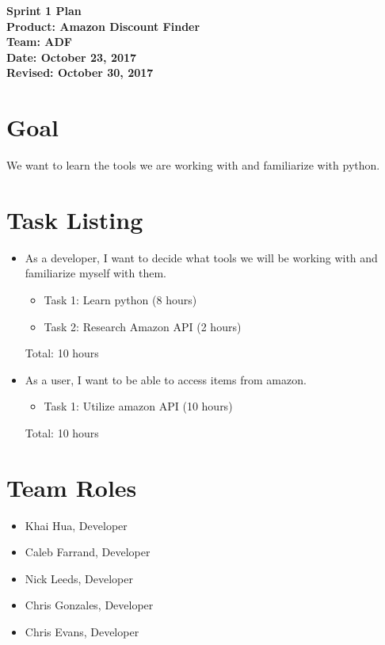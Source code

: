 \documentclass[11pt]{article}
\newcommand\tab[1][1cm]{\hspace*{#1}}
\begin{document}
	\Large{\textbf{Sprint 1 Plan}}\\
	\Large{\textbf{Product: Amazon Discount Finder}}\\
	\Large{\textbf{Team: ADF}}\\
	\Large{\textbf{Date: October 23, 2017}}\\
	\Large{\textbf{Revised: October 30, 2017}}\\
	
	\vspace{-3mm}
	
	\section{Goal}
		\vspace{-3mm}
		\tab \normalsize{We want to learn the tools we are working with and familiarize with python.}
		

	\section{Task Listing}
		\vspace{-3mm}
		\begin{itemize}
			\item As a developer, I want to decide what tools we will be working with and familiarize myself with them.
			\begin{itemize}
			    \item Task 1: Learn python (8 hours)
			    \item Task 2: Research Amazon API (2 hours)
			\end{itemize}
			Total: 10 hours
			\item As a user, I want to be able to access items from amazon.
			\begin{itemize}
			    \item Task 1: Utilize amazon API (10 hours)
			\end{itemize}
			Total: 10 hours
		\end{itemize}
		
	\section{Team Roles}
		\vspace{-3mm}
		\begin{itemize}
		    \item Khai Hua, Developer
		    \item Caleb Farrand, Developer
		    \item Nick Leeds, Developer
		    \item Chris Gonzales, Developer
		    \item Chris Evans, Developer
		\end{itemize}
\end{document}
